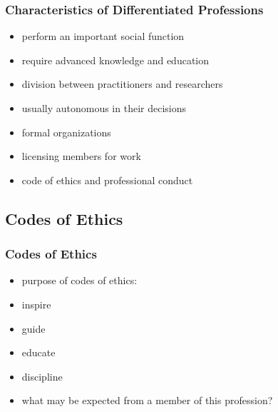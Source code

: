 \documentclass[dvipsnames]{beamer}
\theoremstyle{plain}
\begin{document}
\begin{frame}
  \frametitle{Characteristics of Differentiated Professions}

  \begin{itemize}
    \item perform an important social function

    \pause
    \medskip
    \item require advanced knowledge and education
    \item division between practitioners and researchers

    \pause
    \medskip
    \item usually autonomous in their decisions

    \pause
    \medskip
    \item formal organizations
    \item licensing members for work

    \pause
    \medskip
    \item code of ethics and professional conduct
  \end{itemize}
\end{frame}

\subsection{Codes of Ethics}

\begin{frame}
  \frametitle{Codes of Ethics}

  \begin{itemize}
    \item purpose of codes of ethics:

    \medskip
    \item inspire
    \item guide
    \item educate
    \item discipline

    \pause
    \bigskip
    \item what may be expected from a member of this profession?
  \end{itemize}
\end{frame}

\end{document}
